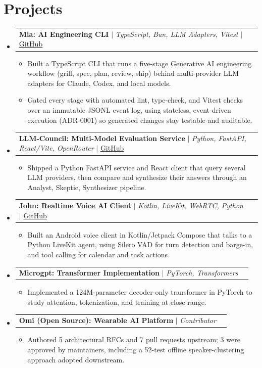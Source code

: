 \documentclass[letterpaper,11pt]{article}
\makeatletter
\newcommand{\resumeItem}[1]{
  \item\small{
    {#1 \vspace{-2pt}}
  }
}
\newcommand{\resumeProjectHeading}[2]{
    \item
    \begin{tabular*}{1.001\textwidth}{l@{\extracolsep{\fill}}r}
      \small#1 & \textbf{\small #2}\\
    \end{tabular*}\vspace{-7pt}
}
\newcommand{\resumeSubHeadingListStart}{\begin{itemize}[leftmargin=0.0in, label={}]}
\newcommand{\resumeSubHeadingListEnd}{\end{itemize}}
\newcommand{\resumeItemListStart}{\begin{itemize}}
\newcommand{\resumeItemListEnd}{\end{itemize}\vspace{-5pt}}
\makeatother
\begin{document}
\section{Projects}
    \vspace{-5pt}
    \resumeSubHeadingListStart
      \resumeProjectHeading
          {\textbf{Mia: AI Engineering CLI} $|$ \emph{TypeScript, Bun, LLM Adapters, Vitest} $|$ \href{https://github.com/thesohamdatta/Mia}{GitHub}}{}
          \resumeItemListStart
            \resumeItem{Built a TypeScript CLI that runs a five-stage Generative AI engineering workflow (grill, spec, plan, review, ship) behind multi-provider LLM adapters for Claude, Codex, and local models.}
            \resumeItem{Gated every stage with automated lint, type-check, and Vitest checks over an immutable JSONL event log, using stateless, event-driven execution (ADR-0001) so generated changes stay testable and auditable.}
          \resumeItemListEnd
          \vspace{-13pt}
      \resumeProjectHeading
          {\textbf{LLM-Council: Multi-Model Evaluation Service} $|$ \emph{Python, FastAPI, React/Vite, OpenRouter} $|$ \href{https://github.com/thesohamdatta/LLM-Council}{GitHub}}{}
          \resumeItemListStart
            \resumeItem{Shipped a Python FastAPI service and React client that query several LLM providers, then compare and synthesize their answers through an Analyst, Skeptic, Synthesizer pipeline.}
          \resumeItemListEnd
          \vspace{-13pt}
      \resumeProjectHeading
          {\textbf{John: Realtime Voice AI Client} $|$ \emph{Kotlin, LiveKit, WebRTC, Python} $|$ \href{https://github.com/thesohamdatta/John}{GitHub}}{}
          \resumeItemListStart
            \resumeItem{Built an Android voice client in Kotlin/Jetpack Compose that talks to a Python LiveKit agent, using Silero VAD for turn detection and barge-in, and tool calling for calendar and task actions.}
          \resumeItemListEnd
          \vspace{-13pt}
      \resumeProjectHeading
          {\textbf{Microgpt: Transformer Implementation} $|$ \emph{PyTorch, Transformers}}{}
          \resumeItemListStart
            \resumeItem{Implemented a 124M-parameter decoder-only transformer in PyTorch to study attention, tokenization, and training at close range.}
          \resumeItemListEnd
          \vspace{-13pt}
      \resumeProjectHeading
          {\textbf{Omi (Open Source): Wearable AI Platform} $|$ \emph{Contributor}}{}
          \resumeItemListStart
            \resumeItem{Authored 5 architectural RFCs and 7 pull requests upstream; 3 were approved by maintainers, including a 52-test offline speaker-clustering approach adopted downstream.}
          \resumeItemListEnd
    \resumeSubHeadingListEnd
\vspace{-15pt}
\end{document}
